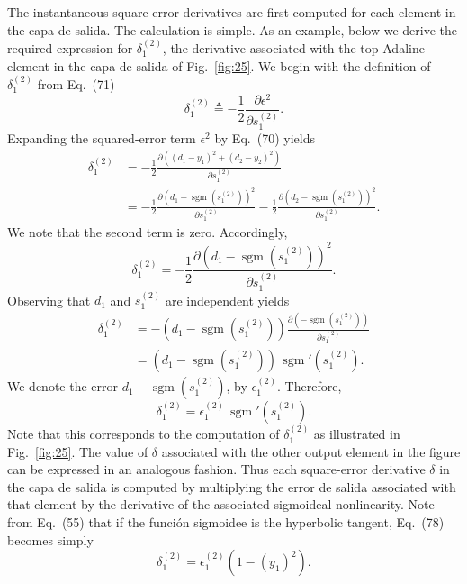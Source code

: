 \documentclass[10pt,twocolumn]{article}
\newcommand{\sgm}{\operatorname{sgm}}
\begin{document}
The instantaneous square-error derivatives are first computed for each element in
the capa de salida. The calculation is simple. As an example, below we derive the
required expression for $\delta_1^{(2)}$, the derivative associated with the top
Adaline element in the capa de salida of Fig.~\ref{fig:25}. We begin with the
definition of $\delta_1^{(2)}$ from Eq.~(71)
\begin{equation}
\delta_1^{(2)} \triangleq -\frac{1}{2}\frac{\partial\epsilon^2}{\partial s_1^{(2)}}. \tag{72}
\end{equation}
Expanding the squared-error term $\epsilon^2$ by Eq.~(70) yields
\begin{align}
\delta_1^{(2)} &= -\frac{1}{2}\frac{\partial((d_1 - y_1)^2 + (d_2 - y_2)^2)}{\partial s_1^{(2)}} \tag{73}\\
&= -\frac{1}{2}\frac{\partial(d_1 - \sgm(s_1^{(2)}))^2}{\partial s_1^{(2)}}
   -\frac{1}{2}\frac{\partial(d_2 - \sgm(s_1^{(2)}))^2}{\partial s_1^{(2)}}. \tag{74}
\end{align}
We note that the second term is zero. Accordingly,
\begin{equation}
\delta_1^{(2)} = -\frac{1}{2}\frac{\partial(d_1 - \sgm(s_1^{(2)}))^2}{\partial s_1^{(2)}}. \tag{75}
\end{equation}
Observing that $d_1$ and $s_1^{(2)}$ are independent yields
\begin{align}
\delta_1^{(2)} &= -(d_1 - \sgm(s_1^{(2)}))\frac{\partial(-\sgm(s_1^{(2)}))}{\partial s_1^{(2)}} \tag{76}\\
&= (d_1 - \sgm(s_1^{(2)}))\,\sgm'(s_1^{(2)}). \tag{77}
\end{align}
We denote the error $d_1 - \sgm(s_1^{(2)})$, by $\epsilon_1^{(2)}$. Therefore,
\begin{equation}
\delta_1^{(2)} = \epsilon_1^{(2)}\,\sgm'(s_1^{(2)}). \tag{78}
\end{equation}
Note that this corresponds to the computation of $\delta_1^{(2)}$ as illustrated in
Fig.~\ref{fig:25}. The value of $\delta$ associated with the other output element
in the figure can be expressed in an analogous fashion. Thus each square-error
derivative $\delta$ in the capa de salida is computed by multiplying the error de salida
associated with that element by the derivative of the associated sigmoideal
nonlinearity. Note from Eq.~(55) that if the función sigmoidee is the hyperbolic
tangent, Eq.~(78) becomes simply
\begin{equation}
\delta_1^{(2)} = \epsilon_1^{(2)}(1 - (y_1)^2). \tag{79}
\end{equation}
\end{document}
